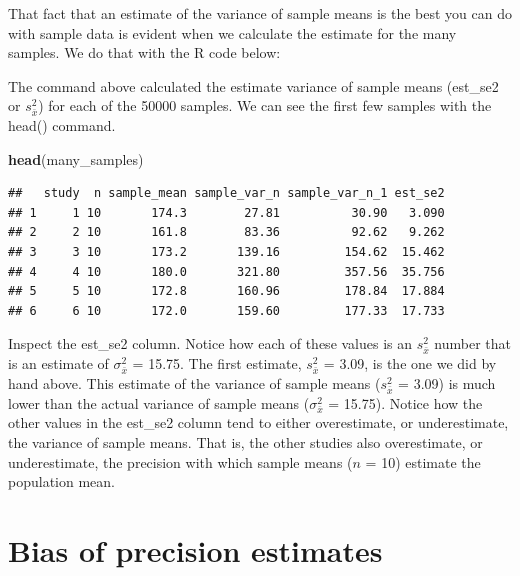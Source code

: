 \documentclass[
]{krantz}
\makeatletter
\newenvironment{Shaded}{\begin{snugshade}}{\end{snugshade}}
\newcommand{\DataTypeTok}[1]{\textcolor[rgb]{0.27,0.27,0.27}{#1}}
\newcommand{\DecValTok}[1]{\textcolor[rgb]{0.06,0.06,0.06}{#1}}
\newcommand{\KeywordTok}[1]{\textcolor[rgb]{0.27,0.27,0.27}{\textbf{#1}}}
\newcommand{\NormalTok}[1]{#1}
\newcommand{\OperatorTok}[1]{\textcolor[rgb]{0.43,0.43,0.43}{\textbf{#1}}}
\newcommand{\StringTok}[1]{\textcolor[rgb]{0.5,0.5,0.5}{#1}}
\newenvironment{kframe}{%
\medskip{}
\setlength{\fboxsep}{.8em}
 \def\at@end@of@kframe{}%
 \ifinner\ifhmode%
  \def\at@end@of@kframe{\end{minipage}}%
  \begin{minipage}{\columnwidth}%
 \fi\fi%
 \def\FrameCommand##1{\hskip\@totalleftmargin \hskip-\fboxsep
 \colorbox{shadecolor}{##1}\hskip-\fboxsep
     \hskip-\linewidth \hskip-\@totalleftmargin \hskip\columnwidth}%
 \MakeFramed {\advance\hsize-\width
   \@totalleftmargin\z@ \linewidth\hsize
   \@setminipage}}%
 {\par\unskip\endMakeFramed%
 \at@end@of@kframe}
\renewenvironment{Shaded}{\begin{kframe}}{\end{kframe}}
\makeatother
\begin{document}
That fact that an estimate of the variance of sample means is the best you can do with sample data is evident when we calculate the estimate for the many samples. We do that with the R code below:

\begin{Shaded}
\end{Shaded}

The command above calculated the estimate variance of sample means (est\_se2 or \(s_{\bar{x}}^2\)) for each of the 50000 samples. We can see the first few samples with the head() command.

\begin{Shaded}
\begin{Highlighting}[]
\KeywordTok{head}\NormalTok{(many_samples)}
\end{Highlighting}
\end{Shaded}

\begin{verbatim}
##   study  n sample_mean sample_var_n sample_var_n_1 est_se2
## 1     1 10       174.3        27.81          30.90   3.090
## 2     2 10       161.8        83.36          92.62   9.262
## 3     3 10       173.2       139.16         154.62  15.462
## 4     4 10       180.0       321.80         357.56  35.756
## 5     5 10       172.8       160.96         178.84  17.884
## 6     6 10       172.0       159.60         177.33  17.733
\end{verbatim}

Inspect the est\_se2 column. Notice how each of these values is an \(s_{\bar{x}}^2\) number that is an estimate of \(\sigma_{\bar{x}}^2\) = 15.75. The first estimate, \(s_{\bar{x}}^2\) = 3.09, is the one we did by hand above. This estimate of the variance of sample means (\(s_{\bar{x}}^2\) = 3.09) is much lower than the actual variance of sample means (\(\sigma_{\bar{x}}^2\) = 15.75). Notice how the other values in the est\_se2 column tend to either overestimate, or underestimate, the variance of sample means. That is, the other studies also overestimate, or underestimate, the precision with which sample means (\(n\) = 10) estimate the population mean.

\hypertarget{bias-of-precision-estimates}{%
\section{Bias of precision estimates}\label{bias-of-precision-estimates}}
\end{document}
